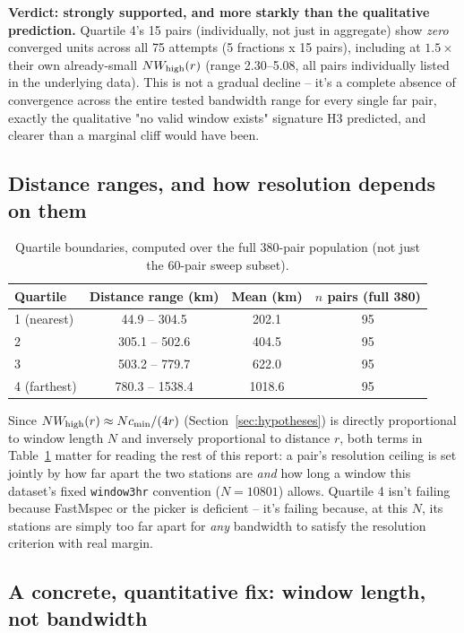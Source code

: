 \documentclass[11pt]{article}
\begin{document}
\textbf{Verdict: strongly supported, and more starkly than the qualitative prediction.} Quartile
4's 15 pairs (individually, not just in aggregate) show \emph{zero} converged units across all 75
attempts (5 fractions x 15 pairs), including at $1.5\times$ their own already-small $NW_{\rm
high}(r)$ (range 2.30--5.08, all pairs individually listed in the underlying data). This is not a
gradual decline -- it's a complete absence of convergence across the entire tested bandwidth
range for every single far pair, exactly the qualitative "no valid window exists" signature H3
predicted, and clearer than a marginal cliff would have been.

\subsection{Distance ranges, and how resolution depends on them}
\label{sec:distance-ranges}

\begin{table}[h]
\centering
\begin{tabular}{lccc}
\toprule
Quartile & Distance range (km) & Mean (km) & $n$ pairs (full 380) \\
\midrule
1 (nearest)  & 44.9 -- 304.5   & 202.1  & 95 \\
2            & 305.1 -- 502.6  & 404.5  & 95 \\
3            & 503.2 -- 779.7  & 622.0  & 95 \\
4 (farthest) & 780.3 -- 1538.4 & 1018.6 & 95 \\
\bottomrule
\end{tabular}
\caption{Quartile boundaries, computed over the full 380-pair population (not just the 60-pair
sweep subset).}
\label{tab:distance-ranges}
\end{table}

Since $NW_{\rm high}(r) \approx Nc_{\min}/(4r)$ (Section~\ref{sec:hypotheses}) is directly
proportional to window length $N$ and inversely proportional to distance $r$, both terms in
Table~\ref{tab:distance-ranges} matter for reading the rest of this report: a pair's resolution
ceiling is set jointly by how far apart the two stations are \emph{and} how long a window this
dataset's fixed \texttt{window3hr} convention ($N=10801$) allows. Quartile 4 isn't failing because
FastMspec or the picker is deficient -- it's failing because, at this $N$, its stations are simply
too far apart for \emph{any} bandwidth to satisfy the resolution criterion with real margin.

\subsection{A concrete, quantitative fix: window length, not bandwidth}
\label{sec:window-length-fix}
\end{document}
